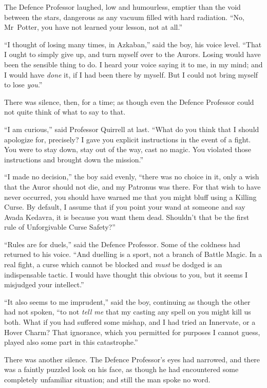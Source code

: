 The Defence Professor laughed, low and humourless, emptier than the void between the stars, dangerous as any vacuum filled with hard radiation. “No, Mr~Potter, you have not learned your lesson, not at all.”

“I thought of losing many times, in Azkaban,” said the boy, his voice level. “That I ought to simply give up, and turn myself over to the Aurors. Losing would have been the sensible thing to do. I heard your voice saying it to me, in my mind; and I would have \emph{done} it, if I had been there by myself. But I could not bring myself to lose \emph{you}.”

There was silence, then, for a time; as though even the Defence Professor could not quite think of what to say to that.

“I am curious,” said Professor Quirrell at last. “What do you think that I should apologize for, precisely? I gave you explicit instructions in the event of a fight. You were to stay down, stay out of the way, cast no magic. You violated those instructions and brought down the mission.”

“I made no decision,” the boy said evenly, “there was no choice in it, only a wish that the Auror should not die, and my Patronus was there. For that wish to have never occurred, you should have warned me that you might bluff using a Killing Curse. By default, I assume that if you point your wand at someone and say Avada Kedavra, it is because you want them dead. Shouldn’t that be the first rule of Unforgivable Curse Safety?”

“Rules are for duels,” said the Defence Professor. Some of the coldness had returned to his voice. “And duelling is a sport, not a branch of Battle Magic. In a real fight, a curse which cannot be blocked and \emph{must} be dodged is an indispensable tactic. I would have thought this obvious to you, but it seems I misjudged your intellect.”

“It also seems to me imprudent,” said the boy, continuing as though the other had not spoken, “to not \emph{tell me} that my casting any spell on you might kill us both. What if you had suffered some mishap, and I had tried an Innervate, or a Hover Charm? That ignorance, which you permitted for purposes I cannot guess, played also some part in this catastrophe.”

There was another silence. The Defence Professor’s eyes had narrowed, and there was a faintly puzzled look on his face, as though he had encountered some completely unfamiliar situation; and still the man spoke no word.

